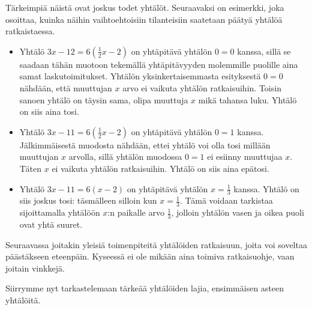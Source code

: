 Tärkeimpiä näistä ovat joskus todet yhtälöt. Seuraavaksi on esimerkki, joka osoittaa, kuinka näihin vaihtoehtoisiin tilanteisiin saatetaan päätyä yhtälöä
ratkaistaessa.

\begin{esimerkki}
	\begin{itemize}
		\item{Yhtälö $3x-12=6(\frac{1}{2}x-2)$ on yhtäpitävä yhtälön $0=0$ kanssa, sillä se saadaan tähän muotoon 
		tekemällä yhtäpitävyyden molemmille puolille aina samat laskutoimitukset. Yhtälön yksinkertaisemmasta esityksestä $0=0$ nähdään, että muuttujan $x$ 
		arvo ei vaikuta yhtälön ratkaisuihin. Toisin sanoen yhtälö on täysin sama, olipa muuttuja $x$ mikä tahansa luku. Yhtälö on siis aina tosi.}
		\item{Yhtälö $3x-11=6(\frac{1}{2}x-2)$ on yhtäpitävä yhtälön $0=1$ kanssa. Jälkimmäisestä muodosta nähdään, ettei yhtälö voi olla tosi millään
		muuttujan $x$ arvolla, sillä yhtälön muodossa $0=1$ ei esiinny muuttujaa $x$. Täten $x$ ei vaikuta yhtälön ratkaisuihin. 
		Yhtälö on siis aina epätosi.}
		\item{Yhtälö $3x-11=6(x-2)$ on yhtäpitävä yhtälön $x=\frac{1}{3}$ kanssa. Yhtälö on siis joskus tosi: täsmälleen silloin kun $x=\frac{1}{3}$.
		Tämä voidaan tarkistaa sijoittamalla yhtälöön $x$:n paikalle arvo $\frac{1}{3}$, jolloin yhtälön vasen ja oikea puoli ovat yhtä suuret.}
	\end{itemize}

\end{esimerkki}


Seuraavassa joitakin yleisiä toimenpiteitä yhtälöiden ratkaisuun, joita voi soveltaa päästäkseen eteenpäin. Kyseessä ei ole mikään aina toimiva
ratkaisuohje, vaan joitain vinkkejä.



Siirrymme nyt tarkastelemaan tärkeää yhtälöiden lajia, ensimmäisen asteen yhtälöitä.
